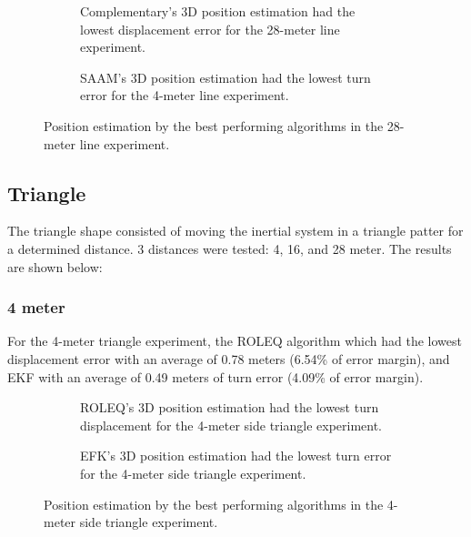 \begin{figure}[H]
    \centering
    \begin{subfigure}{0.49\textwidth}
        \centering
        \resizebox{1\linewidth}{!}{}
        \caption{Complementary's 3D position estimation had the lowest displacement error for the 28-meter line experiment.}
        \label{fig:line28_2D}
    \end{subfigure}
    \begin{subfigure}{0.49\textwidth}
        \centering
        \resizebox{1\linewidth}{!}{}
        \caption{SAAM's 3D position estimation had the lowest turn error for the 4-meter line experiment.}
        \label{fig:line28_3D}
    \end{subfigure}
    \caption{Position estimation by the best performing algorithms in the 28-meter line experiment.}
    \label{fig:line28}
\end{figure}

\subsection{Triangle}

The triangle shape consisted of moving the inertial system in a triangle patter for a determined distance. 3 distances were tested: 4, 16, and 28 meter. The results are shown below:

\subsubsection{4 meter}

For the 4-meter triangle experiment, the ROLEQ algorithm which had the lowest displacement error with an average of 0.78 meters (6.54\% of error margin), and EKF with an average of 0.49 meters of turn error (4.09\% of error margin).

\vspace{-0.5cm}

\vspace{-1.5cm}

\begin{figure}[H]
    \centering
    \begin{subfigure}{0.49\textwidth}
        \centering
        \resizebox{1\linewidth}{!}{}
        \caption{ROLEQ's 3D position estimation had the lowest turn displacement for the 4-meter side triangle experiment.}
        \label{fig:triangle4_2D}
    \end{subfigure}
    \begin{subfigure}{0.49\textwidth}
        \centering
        \resizebox{1\linewidth}{!}{}
        \caption{EFK's 3D position estimation had the lowest turn error for the 4-meter side triangle experiment.}
        \label{fig:triangle4_3D}
    \end{subfigure}
    \caption{Position estimation by the best performing algorithms in the 4-meter side triangle experiment.}
    \label{fig:triangle4}
\end{figure}


